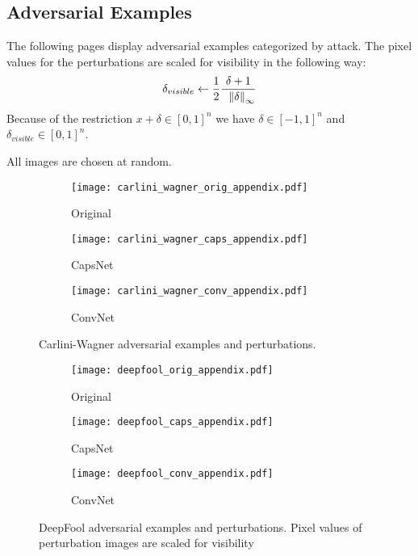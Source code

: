 \subsection{Adversarial Examples}
\label{lab:images}

The following pages display adversarial examples categorized by attack.
The pixel values for the perturbations are scaled for visibility in the following way:
\begin{equation*}
\delta_{visible} \gets \frac{1}{2}\frac{\delta + 1}{\hspace{0.6em}\norm[\infty]{\delta}}
\end{equation*}
Because of the restriction $x + \delta \in [0,1]^n$ we have $\delta \in [-1,1]^n$ and $\delta_{visible} \in [0,1]^n$.

All images are chosen at random.

\begin{figure}
	\centering
	
	\begin{subfigure}{.23\textwidth}
		\centering
		\texttt{[image: carlini\_wagner\_orig\_appendix.pdf]}%
		\caption{Original}%
	\end{subfigure}%
	\begin{subfigure}{.36\textwidth}
		\centering
		\texttt{[image: carlini\_wagner\_caps\_appendix.pdf]}%
		\caption{CapsNet}
	\end{subfigure}%
	\begin{subfigure}{.36\textwidth}
		\centering
		\texttt{[image: carlini\_wagner\_conv\_appendix.pdf]}%
		\caption{ConvNet}
	\end{subfigure}
	\caption[Carlini-Wagner Adversarial Examples]{Carlini-Wagner adversarial examples and perturbations.}
	\label{fig:carlini-wagner-img}
	
\end{figure}


\begin{figure}
	\centering
	
	\begin{subfigure}{.23\textwidth}
		\centering
		\texttt{[image: deepfool\_orig\_appendix.pdf]}%
		\caption{Original}%
	\end{subfigure}%
	\begin{subfigure}{.36\textwidth}
		\centering
		\texttt{[image: deepfool\_caps\_appendix.pdf]}%
		\caption{CapsNet}
	\end{subfigure}%
	\begin{subfigure}{.36\textwidth}
		\centering
		\texttt{[image: deepfool\_conv\_appendix.pdf]}%
		\caption{ConvNet}
	\end{subfigure}
	\caption[DeepFool Adversarial Examples]{DeepFool adversarial examples and perturbations. Pixel values of perturbation images are scaled for visibility}
	\label{fig:deepfool-img}
	
\end{figure}

